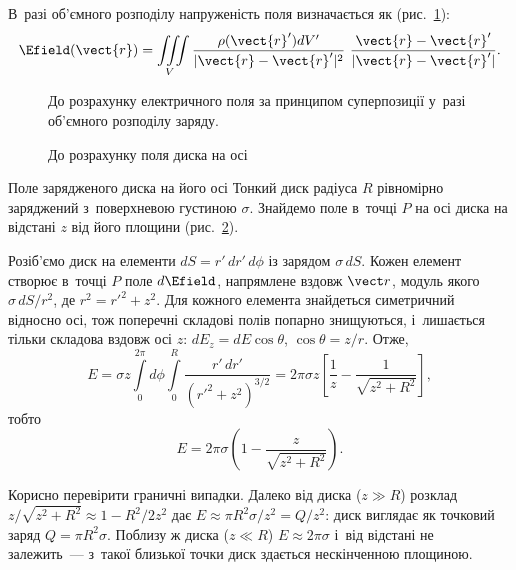В~разі об'ємного розподілу напруженість поля визначається як
(рис.~\ref{tikz:superposition_for_E}):
\begin{equation}\label{eq:intE}
	\Efield(\vect{r}) = \iiint\limits_V \frac{\rho(\vect{r}')dV'}{|\vect{r} - \vect{r}'|^2}\ \frac{\vect{r} - \vect{r}'}{|\vect{r} - \vect{r}'|}.
\end{equation}

\begin{figure}
	\caption{До розрахунку електричного поля за принципом суперпозиції у~разі об'ємного
		розподілу заряду.}
	\label{tikz:superposition_for_E}
\end{figure}

\begin{figure}
	\centering
	\caption{До розрахунку поля диска на осі}
	\label{tikz:DiskField}
\end{figure}

\begin{Example}{Поле зарядженого диска на його осі}
	Тонкий диск радіуса $R$ рівномірно заряджений з~поверхневою густиною $\sigma$. Знайдемо
	поле в~точці $P$ на осі диска на відстані $z$ від його площини
	(рис.~\ref{tikz:DiskField}).

	Розіб'ємо диск на елементи $dS = r'\,dr'\,d\phi$ із зарядом $\sigma\,dS$. Кожен
	елемент створює в~точці $P$ поле $d\Efield$, напрямлене вздовж $\vect r$, модуль якого
	$\sigma\,dS/r^2$, де $r^2 = r'^2 + z^2$. Для кожного елемента знайдеться симетричний
	відносно осі, тож поперечні складові полів попарно знищуються, і~лишається тільки
	складова вздовж осі $z$: $dE_z = dE\cos\theta$, $\cos\theta = z/r$. Отже,
	\begin{equation*}
		E = \sigma z\int\limits_0^{2\pi}d\phi\int\limits_0^R\frac{r'\,dr'}{(r'^2+z^2)^{3/2}}
		= 2\pi\sigma z\left[\frac{1}{z}-\frac{1}{\sqrt{z^2+R^2}}\right],
	\end{equation*}
	тобто
	\begin{equation}\label{eq:DiskField}
		E = 2\pi\sigma\left(1-\frac{z}{\sqrt{z^2+R^2}}\right).
	\end{equation}

	Корисно перевірити граничні випадки. Далеко від диска ($z\gg R$) розклад
	$z/\sqrt{z^2+R^2}\approx 1 - R^2/2z^2$ дає $E\approx \pi R^2\sigma/z^2 = Q/z^2$: диск
	виглядає як точковий заряд $Q=\pi R^2\sigma$. Поблизу ж диска ($z\ll R$) $E\approx
		2\pi\sigma$ і~від відстані не залежить~--- з~такої близької точки диск здається
	нескінченною площиною.
\end{Example}



